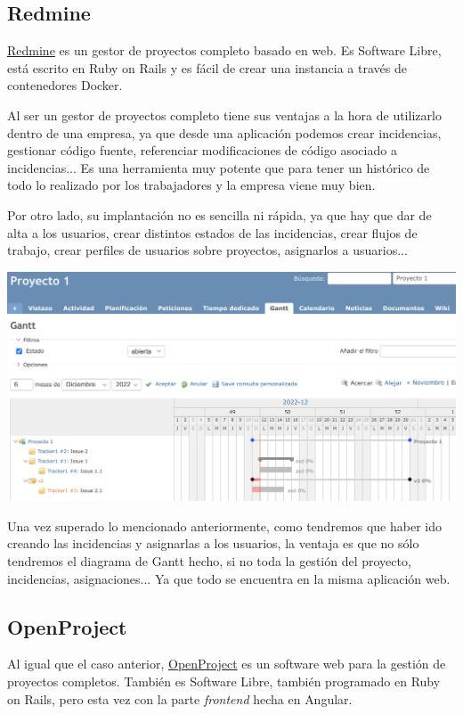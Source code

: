 \documentclass{\ClassPath/viu-tfm-template}
\begin{document}
\subsection{Redmine}

\href{https://www.redmine.org/}{Redmine} es un gestor de proyectos completo basado en web. Es Software Libre, está escrito en Ruby on Rails y es fácil de crear una instancia a través de contenedores Docker.

Al ser un gestor de proyectos completo tiene sus ventajas a la hora de utilizarlo dentro de una empresa, ya que desde una aplicación podemos crear incidencias, gestionar código fuente, referenciar modificaciones de código asociado a incidencias... Es una herramienta muy potente que para tener un histórico de todo lo realizado por los trabajadores y la empresa viene muy bien.

Por otro lado, su implantación no es sencilla ni rápida, ya que hay que dar de alta a los usuarios, crear distintos estados de las incidencias, crear flujos de trabajo, crear perfiles de usuarios sobre proyectos, asignarlos a usuarios...

\begin{center}
    \includegraphics[frame,width=0.7\linewidth]{img/redmine.png}
\end{center}

Una vez superado lo mencionado anteriormente, como tendremos que haber ido creando las incidencias y asignarlas a los usuarios, la ventaja es que no sólo tendremos el diagrama de Gantt hecho, si no toda la gestión del proyecto, incidencias, asignaciones... Ya que todo se encuentra en la misma aplicación web.


\subsection{OpenProject}

Al igual que el caso anterior, \href{https://www.openproject.org/}{OpenProject} es un software web para la gestión de proyectos completos. También es Software Libre, también programado en Ruby on Rails, pero esta vez con la parte \textit{frontend} hecha en Angular.
\end{document}
